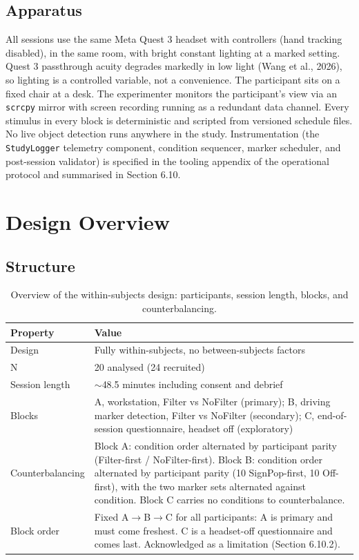 \subsection{Apparatus}

All sessions use the same Meta Quest 3 headset with controllers (hand tracking disabled), in the same
room, with bright constant lighting at a marked setting. Quest 3 passthrough acuity degrades
markedly in low light (Wang et al., 2026), so lighting is a controlled variable, not a convenience.
The participant sits on a fixed chair at a desk. The experimenter monitors the participant's view via
an \verb|scrcpy| mirror with screen recording running as a redundant data channel. Every stimulus in
every block is deterministic and scripted from versioned schedule files. No live object detection
runs anywhere in the study. Instrumentation (the \verb|StudyLogger| telemetry component, condition
sequencer, marker scheduler, and post-session validator) is specified in the tooling appendix of the
operational protocol and summarised in Section 6.10.

\section{Design Overview}

\subsection{Structure}

\begin{longtable}{p{}|p{}}
\caption{Overview of the within-subjects design: participants, session length, blocks, and
counterbalancing.}\\
\hline
\textbf{Property} & \textbf{Value} \\
\hline
\endhead
\hline
Design & Fully within-subjects, no between-subjects factors \\
N & 20 analysed (24 recruited) \\
Session length & $\sim$48.5 minutes including consent and debrief \\
Blocks & A, workstation, Filter vs NoFilter (primary); B, driving marker detection, Filter vs NoFilter (secondary); C, end-of-session questionnaire, headset off (exploratory) \\
Counterbalancing & Block A: condition order alternated by participant parity (Filter-first / NoFilter-first). Block B: condition order alternated by participant parity (10 SignPop-first, 10 Off-first), with the two marker sets alternated against condition. Block C carries no conditions to counterbalance. \\
Block order & Fixed A$\rightarrow$B$\rightarrow$C for all participants: A is primary and must come freshest. C is a headset-off questionnaire and comes last. Acknowledged as a limitation (Section 6.10.2). \\
\hline
\end{longtable}

